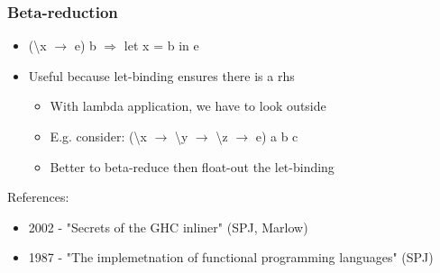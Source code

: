 \documentclass[aspectratio=169]{beamer}
\begin{document}
\begin{frame}
  \frametitle{Beta-reduction}

  \begin{itemize}
    \item (\textbackslash{}x $\rightarrow$ e) b $\Longrightarrow$ let x = b in e
    \item Useful because let-binding ensures there is a rhs
    \begin{itemize}
      \item With lambda application, we have to look outside
      \item E.g. consider: (\textbackslash{}x $\rightarrow$ \textbackslash{}y
        $\rightarrow$ \textbackslash{}z $\rightarrow$ e) a b c
      \item Better to beta-reduce then float-out the let-binding
    \end{itemize}
  \end{itemize}

  References:

  \begin{itemize}
    \item 2002 - "Secrets of the GHC inliner" (SPJ, Marlow)
    \item 1987 - "The implemetnation of functional programming languages" (SPJ)
  \end{itemize}
\end{frame}
\end{document}
